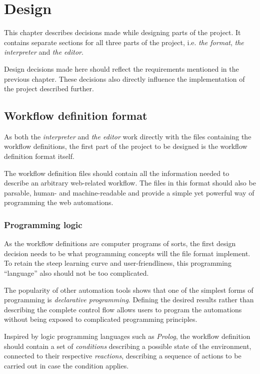 \chapter{Design}

This chapter describes decisions made while designing parts of the project. 
It contains separate sections for all three parts of the project, i.e. \textit{the format}, \textit{the interpreter} and \textit{the editor}.

Design decisions made here should reflect the requirements mentioned in the previous chapter.
These decisions also directly influence the implementation of the project described further.

\section{Workflow definition format}

As both the \textit{interpreter} and \textit{the editor} work directly with the files containing the workflow definitions, the first part of the project to be designed is the workflow definition format itself.

The workflow definition files should contain all the information needed to describe an arbitrary web-related workflow. 
The files in this format should also be parsable, human- and machine-readable and provide a simple yet powerful way of programming the web automations.

\subsection{Programming logic}

As the workflow definitions are computer programs of sorts, the first design decision needs to be what programming concepts will the file format implement.
To retain the steep learning curve and user-friendliness, this programming ``language'' also should not be too complicated.

The popularity of other automation tools shows that one of the simplest forms of programming is \textit{declarative programming}.
Defining the desired results rather than describing the complete control flow allows users to program the automations without being exposed to complicated programming principles.

Inspired by logic programming languages such as \textit{Prolog}, the workflow definition should contain a set of \textit{conditions} describing a possible state of the environment, connected to their respective \textit{reactions}, describing a sequence of actions to be carried out in case the condition applies.

